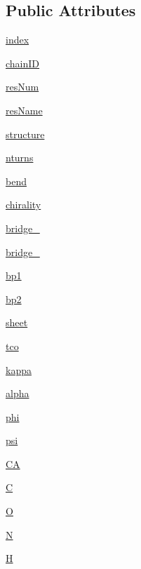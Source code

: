 \subsection*{Public Attributes}
\begin{DoxyCompactItemize}
\item 
\hyperlink{classclasses_1_1Residue_ab030195b5da491ab560f64c3eb1808c5}{index}
\item 
\hyperlink{classclasses_1_1Residue_a43f7aa75c8fbb7e428e14f0f44ae40f8}{chain\+ID}
\item 
\hyperlink{classclasses_1_1Residue_aaf2c88576b265dfb10716860fb8e405b}{res\+Num}
\item 
\hyperlink{classclasses_1_1Residue_acc5999232eb344530bd0f2ea23f03390}{res\+Name}
\item 
\hyperlink{classclasses_1_1Residue_ac20215b78f278e716204a27ebb92fa66}{structure}
\item 
\hyperlink{classclasses_1_1Residue_adebc1673f0735701597cca7d71b15d2f}{nturns}
\item 
\hyperlink{classclasses_1_1Residue_a59375cd6b4b684c3ab3166b62de251a6}{bend}
\item 
\hyperlink{classclasses_1_1Residue_a6684373da1e5d501b8ce5b6fbf34109c}{chirality}
\item 
\hyperlink{classclasses_1_1Residue_ac9fbeaec55de48535e374b259ae110d6}{bridge\+\_}
\item 
\hyperlink{classclasses_1_1Residue_a338e20c02299829e9b46654c4f948968}{bridge\+\_}
\item 
\hyperlink{classclasses_1_1Residue_af9198b85f24a8c9100cca8cb8e115b7c}{bp1}
\item 
\hyperlink{classclasses_1_1Residue_a3624b0c66aa27b1bd2d2a736bad1ce15}{bp2}
\item 
\hyperlink{classclasses_1_1Residue_a3b2cdeea30ce954df676aea8ab2b8da3}{sheet}
\item 
\hyperlink{classclasses_1_1Residue_a21b24a0d44cd90ba82d8ea839677f13a}{tco}
\item 
\hyperlink{classclasses_1_1Residue_a26a69a1379e7d13c49986c616448c7bc}{kappa}
\item 
\hyperlink{classclasses_1_1Residue_ae371572e3671ec59bd5e84fd0f38c35c}{alpha}
\item 
\hyperlink{classclasses_1_1Residue_affb035d89dac868f5f5ac5cb33d17bfa}{phi}
\item 
\hyperlink{classclasses_1_1Residue_a39a79c22e546834f17840d6fdf3ef866}{psi}
\item 
\hyperlink{classclasses_1_1Residue_ad4c2e36894a433ad22a4ab76cb94d5a4}{CA}
\item 
\hyperlink{classclasses_1_1Residue_af458ca73be3ac0aec7e8a4ff46a1b2ef}{C}
\item 
\hyperlink{classclasses_1_1Residue_a89511298f8339b581291e2f3de8296e4}{O}
\item 
\hyperlink{classclasses_1_1Residue_a1ab3ef65cd6e20779990207238ba2e13}{N}
\item 
\hyperlink{classclasses_1_1Residue_a3111b72af2208426aeb6d44c5d5b1b3d}{H}
\end{DoxyCompactItemize}


